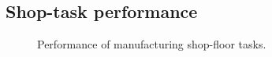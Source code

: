 \documentclass[final,5p,times,twocolumn]{elsarticle}
\begin{document}
\subsection*{Shop-task performance}
\begin{figure}
\label{fig:mfg-stat} 
\begin{centering}
\newline
{}
\newline
\caption{Performance of manufacturing shop-floor tasks.} 
\end{centering}
\end{figure}
\end{document}
